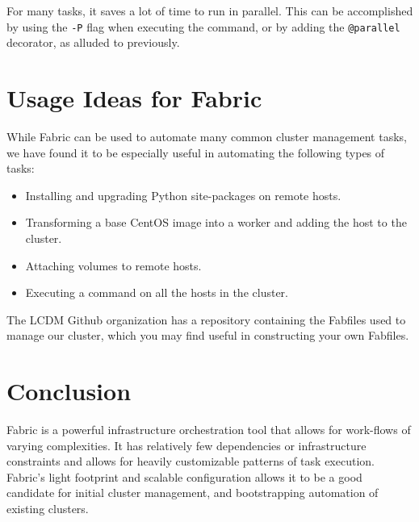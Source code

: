 \documentclass[9pt,twocolumn,twoside]{idsi}
\begin{document}
For many tasks, it saves a lot of time to run in parallel. This can be accomplished by using the \texttt{-P} flag when executing the command, or by adding the \texttt{@parallel} decorator, as alluded to previously.

\section{Usage Ideas for Fabric}
While Fabric can be used to automate many common cluster management tasks, we have found it to be especially useful in automating the following types of tasks:
\begin{itemize}
  \item Installing and upgrading Python site-packages on remote hosts.
  \item Transforming a base CentOS image into a worker and adding the host to the cluster.
  \item Attaching volumes to remote hosts.
  \item Executing a command on all the hosts in the cluster.
\end{itemize}
The LCDM Github organization has a repository containing the Fabfiles used to manage our cluster, which you may find useful in constructing your own Fabfiles.

\section{Conclusion}
Fabric is a powerful infrastructure orchestration tool that allows for work-flows of varying complexities. It has relatively few dependencies or infrastructure constraints and allows for heavily customizable patterns of task execution. Fabric's light footprint and scalable configuration allows it to be a good candidate for initial cluster management, and bootstrapping automation of existing clusters.
\end{document}
